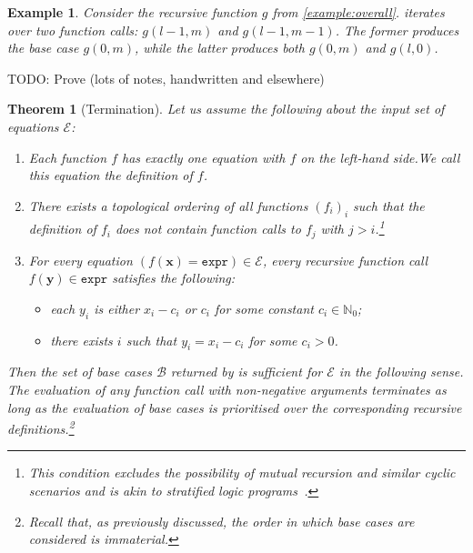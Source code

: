 \documentclass{article}
\newtheorem{theorem}{Theorem}
\newtheorem{example}{Example}
\theoremstyle{remark}
\newcommand{\expr}{\mathtt{expr}}
\begin{document}
\begin{example}
  Consider the recursive function $g$ from \cref{example:overall}.
   iterates over two function calls: $g(l-1, m)$
  and $g(l-1, m-1)$. The former produces the base case $g(0, m)$, while the
  latter produces both $g(0, m)$ and $g(l, 0)$.
\end{example}

TODO: Prove (lots of notes, handwritten and elsewhere)

\begin{theorem}[Termination]\label{thm:halting}
  Let us assume the following about the input set of equations $\mathcal{E}$:
  \begin{enumerate}
    \item Each function $f$ has exactly one equation with $f$ on the left-hand
          side.\@ We call this equation the \emph{definition} of $f$.
    \item There exists a topological ordering of all functions ${(f_{i})}_{i}$
          such that the definition of $f_{i}$ does not contain function calls to
          $f_{j}$ with $j > i$.\footnote{This condition excludes the possibility
          of mutual recursion and similar cyclic scenarios and is akin to
          stratified logic programs~\cite{DBLP:books/sp/Lloyd87}.}
    \item For every equation $(f(\mathbf{x}) = \expr) \in \mathcal{E}$, every
          recursive function call $f(\mathbf{y}) \in \expr$ satisfies the
          following:
          \begin{itemize}
            \item each $y_{i}$ is either $x_{i} - c_{i}$ or $c_{i}$ for some
                  constant $c_{i} \in \mathbb{N}_{0}$;
            \item there exists $i$ such that $y_{i} = x_{i} - c_{i}$ for some
                  $c_{i} > 0$.
          \end{itemize}
  \end{enumerate}
  Then the set of base cases $\mathcal{B}$ returned by
   is \emph{sufficient} for $\mathcal{E}$ in the
  following sense. The evaluation of any function call with non-negative
  arguments terminates as long as the evaluation of base cases is prioritised
  over the corresponding recursive definitions.\footnote{Recall that, as
    previously discussed, the order in which base cases are considered is
    immaterial.}
\end{theorem}
\end{document}
